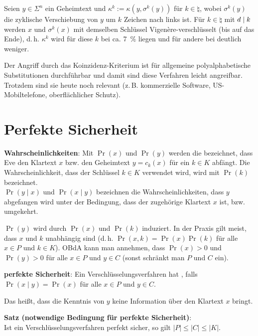 Seien $y \in \Sigma^n$ ein Geheimtext und $\kappa^k := \kappa(y, \sigma^k(y))$ für
$k \in \natural$, wobei $\sigma^k(y)$ die zyklische Verschiebung von $y$ um $k$ Zeichen nach links
ist.
Für $k \in \natural$ mit $d \mid k$ werden $x$ und $\sigma^k(x)$ mit demselben Schlüssel
Vigenère-verschlüsselt (bis auf das Ende), d.\,h. $\kappa^k$ wird für diese $k$ bei
ca. \SI{7}{\percent} liegen und für andere bei deutlich weniger.

Der Angriff durch das Koinzidenz-Kriterium ist für allgemeine polyalphabetische Substitutionen
durchführbar und damit sind diese Verfahren leicht angreifbar.
Trotzdem sind sie heute noch relevant
(z.\,B. kommerzielle Software, US-Mobiltelefone, oberflächlicher Schutz).

\pagebreak

\section{%
    Perfekte Sicherheit%
}

\textbf{Wahrscheinlichkeiten}:
Mit $\Pr(x)$ und $\Pr(y)$ werden die  bezeichnet,
dass Eve den Klartext $x$ bzw. den Geheimtext $y = c_k(x)$ für ein $k \in K$ abfängt.
Die Wahrscheinlichkeit, dass der Schlüssel $k \in K$ verwendet wird, wird mit $\Pr(k)$
bezeichnet.\\
$\Pr(y \;|\; x)$ und $\Pr(x \;|\; y)$ bezeichnen die Wahrscheinlichkeiten, dass $y$ abgefangen
wird unter der Bedingung, dass der zugehörige Klartext $x$ ist, bzw. umgekehrt.

$\Pr(y)$ wird durch $\Pr(x)$ und $\Pr(k)$ induziert.
In der Praxis gilt meist, dass $x$ und $k$ unabhängig sind (d.\,h. $\Pr(x, k) = \Pr(x) \Pr(k)$
für alle $x \in P$ und $k \in K$).
OBdA kann man annehmen, dass $\Pr(x) > 0$ und $\Pr(y) > 0$ für alle
$x \in P$ und $y \in C$ (sonst schränkt man $P$ und $C$ ein).

\textbf{perfekte Sicherheit}:
Ein Verschlüsselungsverfahren hat , falls\\
$\Pr(x \;|\; y) = \Pr(x)$ für alle $x \in P$ und $y \in C$.

Das heißt, dass die Kenntnis von $y$ keine Information über den Klartext $x$ bringt.

\linie

\textbf{Satz (notwendige Bedingung für perfekte Sicherheit)}:\\
Ist ein Verschlüsselungsverfahren perfekt sicher, so gilt
$|P| \le |C| \le |K|$.

